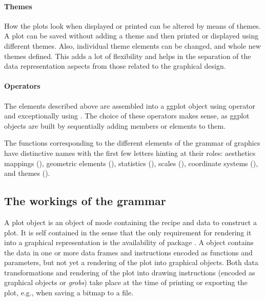 \documentclass[krantz2]{krantz}\usepackage{knitr}
\begin{document}
\paragraph{Themes}
How the plots look when displayed or printed can be altered by means of themes. A plot can be saved without adding a theme and then printed or displayed using different themes. Also, individual theme elements can be changed, and whole new themes defined. This adds a lot of flexibility and helps in the separation of the data representation aspects from those related to the graphical design.

\paragraph{Operators}
The elements described above are assembled into a ggplot object using operator \Roperator{+} and exceptionally using \Roperator{\%+\%}. The choice of these operators makes sense, as ggplot objects are built by sequentially adding members or elements to them.

\begin{warningbox}
The functions corresponding to the different elements of the grammar of graphics have distinctive names with the first few letters hinting at their roles: aesthetics mappings (), geometric elements (), statistics (), scales (), coordinate systems (), and themes ().
\end{warningbox}

\subsection{The workings of the grammar}\label{sec:plot:workings}
A  plot object is an \Rlang object of mode  containing the recipe and data to construct a plot. It is self contained in the sense that the only requirement for rendering it into a graphical representation is the availability of package . A  object contains the data in one or more data frames and instructions encoded as functions and parameters, but not yet a rendering of the plot into graphical objects. Both data transformations and rendering of the plot into drawing instructions (encoded as graphical objects or \emph{grobs}) take place at the time of printing or exporting the plot, e.g., when saving a bitmap to a file.
\end{document}

